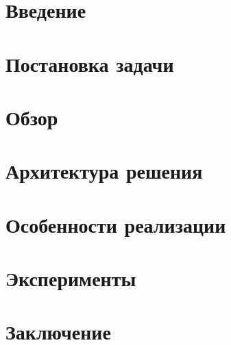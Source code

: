 

\usepackage{caption}
\usepackage{listings}


\graphicspath{ {images/} }



\maketitle
\setcounter{tocdepth}{2}
\tableofcontents

\section*{Введение}


\section*{Постановка задачи}
\label{sec:task}


\section{Обзор}
\label{sec:relatedworks}


\section{Архитектура решения}


\section{Особенности реализации}


\section{Эксперименты}


\section*{Заключение}


\setmonofont[Mapping=tex-text]{CMU Typewriter Text}



